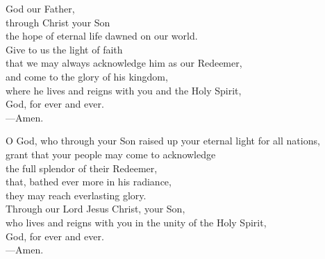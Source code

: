 \prayer

\begin{prayerverse}

God our Father,\\
through Christ your Son\\
the hope of eternal life dawned on our world.\\
Give to us the light of faith\\
that we may always acknowledge him as our Redeemer,\\
and come to the glory of his kingdom,\\
where he lives and reigns with you and the Holy Spirit,\\
God, for ever and ever.\\
{\color{red}---\thinspace}Amen.

\end{prayerverse}


\begin{prayerverse}

O God, who through your Son raised up your eternal light for all nations,\\
grant that your people may come to acknowledge\\
the full splendor of their Redeemer,\\
that, bathed ever more in his radiance,\\
they may reach everlasting glory.\\
Through our Lord Jesus Christ, your Son,\\
who lives and reigns with you in the unity of the Holy Spirit,\\
God, for ever and ever.\\
{\color{red}---\thinspace}Amen.

\end{prayerverse}